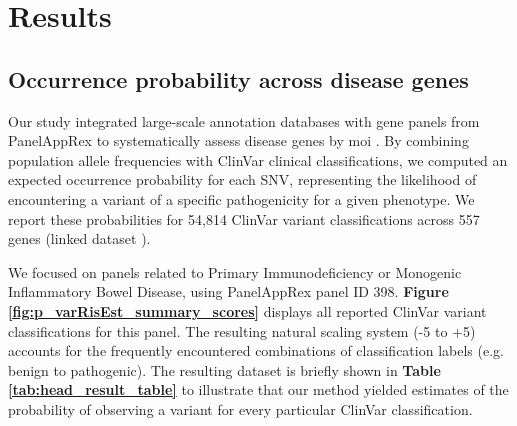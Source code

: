 \section{Results}
\subsection{Occurrence probability across disease genes}
\label{sec:pro_obs}
Our study integrated large-scale annotation databases with gene panels from PanelAppRex to systematically assess disease genes by \ac{moi} 
\cite{lawless_panelapprex_2025}. 
By combining population allele frequencies with ClinVar clinical classifications, we computed an expected occurrence probability for each SNV, representing the likelihood of encountering a variant of a specific pathogenicity for a given phenotype. We report these probabilities for 54,814 ClinVar variant classifications across 557 genes (linked dataset \cite{lawless_2025_15111584}).

We focused on panels related to Primary Immunodeficiency or Monogenic Inflammatory Bowel Disease, using PanelAppRex panel ID 398.
\textbf{Figure \ref{fig:p_varRisEst_summary_scores}} displays all reported ClinVar  variant classifications for this panel. The resulting natural scaling system (-5 to +5) accounts for the frequently encountered combinations of classification labels (e.g. benign to pathogenic).
The resulting dataset \cite{lawless_2025_15111584} is briefly shown in \textbf{Table \ref{tab:head_result_table}} to illustrate that our method yielded estimates of the probability of observing a variant for every particular ClinVar classification. 

